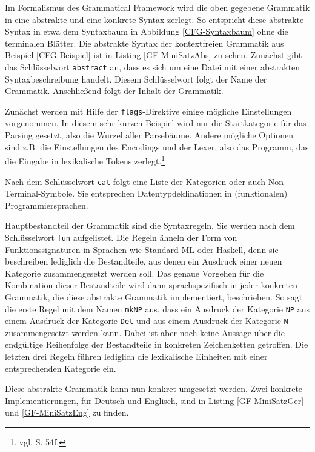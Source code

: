 Im Formalismus des Grammatical Framework wird die oben gegebene Grammatik in eine abstrakte und eine konkrete Syntax zerlegt. So entspricht diese abstrakte Syntax in etwa dem Syntaxbaum in Abbildung \ref{CFG-Syntaxbaum} ohne die terminalen Blätter. Die abstrakte Syntax der kontextfreien Grammatik aus Beispiel \ref{CFG-Beispiel} ist in Listing \ref{GF-MiniSatzAbs} zu sehen. Zunächst gibt das Schlüsselwort \texttt{abstract} an, dass es sich um eine Datei mit einer abstrakten Syntaxbeschreibung handelt. Diesem Schlüsselwort folgt der Name der Grammatik. Anschließend folgt der Inhalt der Grammatik. \par
Zunächst werden mit Hilfe der \texttt{flags}-Direktive einige mögliche Einstellungen vorgenommen. In diesem sehr kurzen Beispiel wird nur die Startkategorie für das Parsing gesetzt, also die Wurzel aller Parsebäume. Andere mögliche Optionen sind z.B. die Einstellungen des Encodings und der Lexer, also das Programm, das die Eingabe in lexikalische Tokens zerlegt.\footnote{vgl. \cite{RANTA2011} S. 54f.} \par
Nach dem Schlüsselwort \texttt{cat} folgt eine Liste der Kategorien oder auch Non-Terminal-Symbole. Sie entsprechen Datentypdeklinationen in (funktionalen) Programmiersprachen. \par
Hauptbestandteil der Grammatik sind die Syntaxregeln. Sie werden nach dem Schlüsselwort \texttt{fun} aufgelistet. Die Regeln ähneln der Form von Funktionssignaturen in Sprachen wie Standard ML oder Haskell, denn sie beschreiben lediglich die Bestandteile, aus denen ein Ausdruck einer neuen Kategorie zusammengesetzt werden soll. Das genaue Vorgehen für die Kombination dieser Bestandteile wird dann sprachspezifisch in jeder konkreten Grammatik, die diese abstrakte Grammatik implementiert, beschrieben. So sagt die erste Regel mit dem Namen \texttt{mkNP} aus, dass ein Ausdruck der Kategorie \texttt{NP} aus einem Ausdruck der Kategorie \texttt{Det} und aus einem Ausdruck der Kategorie \texttt{N} zusammengesetzt werden kann. Dabei ist aber noch keine Aussage über die endgültige Reihenfolge der Bestandteile in konkreten Zeichenketten getroffen. Die letzten drei Regeln führen lediglich die lexikalische Einheiten mit einer entsprechenden Kategorie ein. \par

Diese abstrakte Grammatik kann nun konkret umgesetzt werden. Zwei konkrete Implementierungen, für Deutsch und Englisch, sind in Listing \ref{GF-MiniSatzGer} und \ref{GF-MiniSatzEng} zu finden. \par
